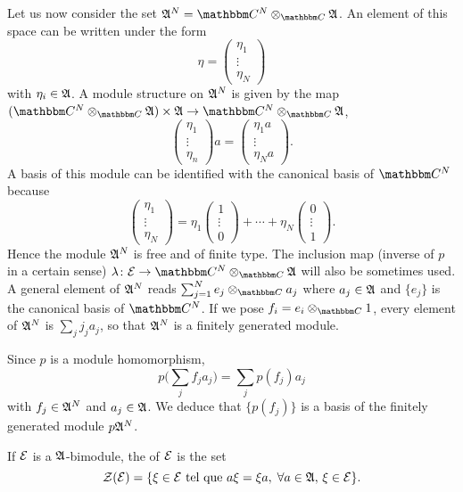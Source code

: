 Let us now consider the set $\cA^N=\eC^N\otimes_{\eC}\cA$. An element of this space can be written under the form 
\[ 
  \eta=
\begin{pmatrix}
\eta_1\\\vdots\\\eta_N
\end{pmatrix}
\]
with $\eta_i\in\mathfrak{A}$. A module structure on $\mathfrak{A}^N$ is given by the map $(\eC^N\otimes_{\eC}\cA)\times\cA\to \eC^N\otimes_{\eC}\cA$,
\[ 
  \begin{pmatrix}
\eta_1\\\vdots\\\eta_n
\end{pmatrix}a=
\begin{pmatrix}
\eta_1 a\\\vdots\\\eta_N a
\end{pmatrix}.
\]
A basis of this module can be identified with the canonical basis of $\eC^N$ because
\[ 
  \begin{pmatrix}
\eta_1\\\vdots\\\eta_N
\end{pmatrix}=\eta_1
\begin{pmatrix}
1\\\vdots\\0
\end{pmatrix}+\cdots+
\eta_N\begin{pmatrix}
0\\\vdots\\1
\end{pmatrix}.
\]
Hence the module $\mathfrak{A}^N$ is free and of finite type. The inclusion map (inverse of $p$ in a certain sense) $\lambda\colon \modE\to \eC^N\otimes_{\eC}\cA$\label{PgdeflambdaMod} will also be sometimes used. A general element of $\mathfrak{A}^N$ reads $\sum_{j=1}^{N}e_j\otimes_{\eC}a_j$ where $a_j\in\mathfrak{A}$ and $\{ e_j \}$ is the canonical basis of $\eC^N$. If we pose $f_i=e_i\otimes_{\eC}1$, every element of $\mathfrak{A}^{N}$ is $\sum_{j}j_ja_j$, so that $\mathfrak{A}^N$ is a finitely generated module.


Since $p$ is a module homomorphism,
\[ 
  p\big( \sum_{j}f_ja_j \big)=\sum_j p(f_j)a_j
\]
with $f_j\in\mathfrak{A}^N$ and $a_j\in\mathfrak{A}$. We deduce that $\{ p(f_j) \}$ is a basis of the finitely generated module $p\mathfrak{A}^N$.

If $\mathcal{E}$ is a $\mathfrak{A}$-bimodule, the  of $\mathcal{E}$ is the set
\begin{equation}
\mathcal{Z}(\mathcal{E})=\{ \xi\in\mathcal{E}\text{ tel que } a\xi=\xi a,\;\forall a\in\mathfrak{A},\,\xi\in\mathcal{E} \}.
\end{equation}

